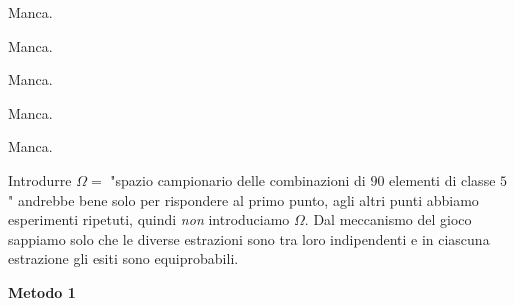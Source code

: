 \Soluzione

Manca.

\Soluzione

Manca.

\Soluzione

Manca.

\Soluzione

Manca.

\Soluzione

Manca.

\Soluzione

Introdurre $\Omega =$ "spazio campionario delle combinazioni di $90$ elementi di classe $5$" andrebbe bene solo per rispondere al primo punto, agli altri punti abbiamo esperimenti ripetuti, quindi \textit{non} introduciamo $\Omega $. Dal meccanismo del gioco sappiamo solo che le diverse estrazioni sono tra loro indipendenti e in ciascuna estrazione gli esiti sono equiprobabili.

\textbf{Metodo 1}

